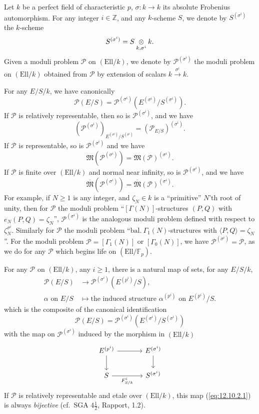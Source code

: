\kmitem\label{item:12.10.1}
Let $k$ be a perfect field of characteristic $p$, $\sigma : k \to k$ its absolute Frobenius automorphism. For any integer $i \in \mathbb{Z}$, and any $k$-scheme $S$, we denote by $S^{(\sigma^i)}$ the $k$-scheme
\[
S^{(\sigma^i)} = S \underset{k, \sigma^i}{\otimes} k .
\]
Given a moduli problem $\mathcal{P}$ on $(\mathrm{Ell}/k)$, we denote by $\mathcal{P}^{(\sigma^i)}$ the moduli problem on $(\mathrm{Ell}/k)$ obtained from $\mathcal{P}$ by extension of scalars $k \xrightarrow{\sigma^i} k$.

For any $E/S/k$, we have canonically
\[
\mathcal{P}(E/S) = \mathcal{P}^{(\sigma^i)}(E^{(\sigma^i)}/S^{(\sigma^i)}) .
\]
If $\mathcal{P}$ is relatively representable, then so is $\mathcal{P}^{(\sigma^i)}$, and we have
\[
(\mathcal{P}^{(\sigma^i)})_{E^{(\sigma^i)}/S^{(\sigma^i)}} = (\mathcal{P}_{E/S})^{(\sigma^i)} .
\]
If $\mathcal{P}$ is representable, so is $\mathcal{P}^{(\sigma^i)}$ and we have
\[
\mathfrak{M}(\mathcal{P}^{(\sigma^i)}) = \mathfrak{M}(\mathcal{P})^{(\sigma^i)} .
\]
If $\mathcal{P}$ is finite over $(\mathrm{Ell}/k)$ and normal near infinity, so is $\mathcal{P}^{(\sigma^i)}$, and we have
\[
\overline{\mathfrak{M}}(\mathcal{P}^{(\sigma^i)}) = \overline{\mathfrak{M}}(\mathcal{P})^{(\sigma^i)} .
\]
For example, if $N \ge 1$ is any integer, and $\zeta_N \in k$ is a ``primitive'' $N$'th root of unity, then for $\mathcal{P}$ the moduli problem ``$[\Gamma(N)]$-structures $(P, Q)$ with $e_N(P, Q) = \zeta_N$'', $\mathcal{P}^{(\sigma^i)}$ is the analogous moduli problem defined with respect to $\zeta_N^{\sigma^i}$. Similarly for $\mathcal{P}$ the moduli problem ``$\mathrm{bal.}\ \Gamma_1(N)$-structures with $\langle P, Q \rangle = \zeta_N$''. For the moduli problem $\mathcal{P} = [\Gamma_1(N)]$ or $[\Gamma_0(N)]$, we have $\mathcal{P}^{(\sigma^i)} = \mathcal{P}$, as we do for any $\mathcal{P}$ which begins life on $(\mathrm{Ell}/\mathbb{F}_p)$.

\kmitem\label{item:12.10.2}
For any $\mathcal{P}$ on $(\mathrm{Ell}/k)$, any $i \ge 1$, there is a natural map of sets, for any $E/S/k$,
\begin{equation}\label{eq:12.10.2.1}
\begin{aligned}
\mathcal{P}(E/S) &\to \mathcal{P}^{(\sigma^i)}(E^{(p^i)}/S) , \\
\alpha \text{ on } E/S &\mapsto \text{the induced structure } \alpha^{(p^i)} \text{ on } E^{(p^i)}/S .
\end{aligned}
\end{equation}
which is the composite of the canonical identification
\[
\mathcal{P}(E/S) = \mathcal{P}^{(\sigma^i)}(E^{(\sigma^i)}/S^{(\sigma^i)})
\]
with the map on $\mathcal{P}^{(\sigma^i)}$ induced by the morphism in $(\mathrm{Ell}/k)$
\[
\begin{tikzcd}[row sep=1.8em, column sep=large]
E^{(p^i)} \arrow[r] \arrow[d] & E^{(\sigma^i)} \arrow[d] \\
S \arrow[r, "F^i_{S/k}"'] & S^{(\sigma^i)}
\end{tikzcd}
\]
If $\mathcal{P}$ is relatively representable and etale over $(\mathrm{Ell}/k)$, this map (\ref{eq:12.10.2.1}) is always \emph{bijective} (cf.~SGA $4\frac{1}{2}$, Rapport, 1.2).


